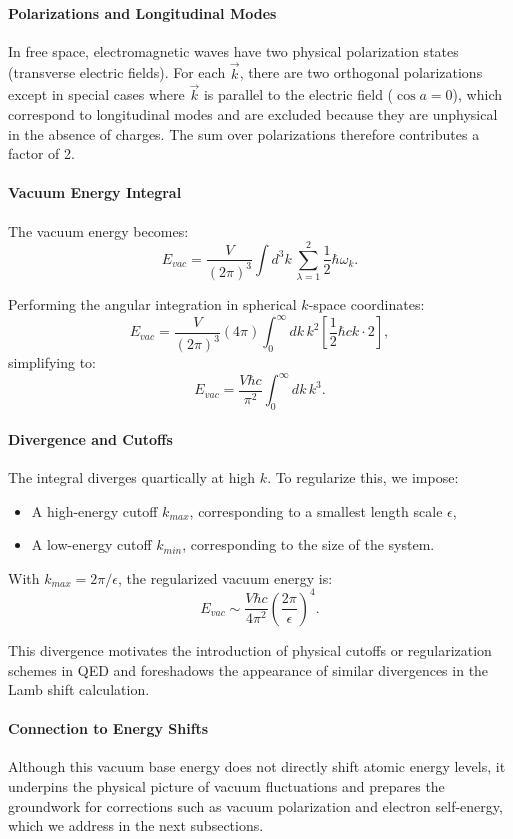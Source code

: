 \documentclass[12pt]{article}
\begin{document}
\paragraph{Polarizations and Longitudinal Modes}
In free space, electromagnetic waves have two physical polarization states (transverse electric fields). For each \(\vec{k}\), there are two orthogonal polarizations except in special cases where \(\vec{k}\) is parallel to the electric field (\(\cos a = 0\)), which correspond to longitudinal modes and are excluded because they are unphysical in the absence of charges. The sum over polarizations therefore contributes a factor of 2.

\paragraph{Vacuum Energy Integral}
The vacuum energy becomes:
\[
E_{vac} = \frac{V}{(2\pi)^3}\int d^3k\, \sum_{\lambda=1}^2 \frac{1}{2}\hbar\omega_k.
\]

Performing the angular integration in spherical \(k\)-space coordinates:
\[
E_{vac} = \frac{V}{(2\pi)^3}(4\pi)\int_0^\infty dk\,k^2 \left[\frac{1}{2}\hbar c k \cdot 2\right],
\]
simplifying to:
\[
E_{vac} = \frac{V\hbar c}{\pi^2}\int_0^\infty dk\,k^3.
\]

\paragraph{Divergence and Cutoffs}
The integral diverges quartically at high \(k\). To regularize this, we impose:
\begin{itemize}
    \item A high-energy cutoff \(k_{max}\), corresponding to a smallest length scale \(\epsilon\),
    \item A low-energy cutoff \(k_{min}\), corresponding to the size of the system.
\end{itemize}

With \(k_{max}=2\pi/\epsilon\), the regularized vacuum energy is:
\[
E_{vac} \sim \frac{V\hbar c}{4\pi^2}\left(\frac{2\pi}{\epsilon}\right)^4.
\]

This divergence motivates the introduction of physical cutoffs or regularization schemes in QED and foreshadows the appearance of similar divergences in the Lamb shift calculation.

\paragraph{Connection to Energy Shifts}
Although this vacuum base energy does not directly shift atomic energy levels, it underpins the physical picture of vacuum fluctuations and prepares the groundwork for corrections such as vacuum polarization and electron self-energy, which we address in the next subsections.
\end{document}
